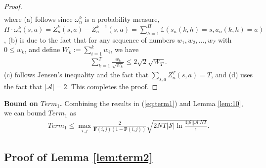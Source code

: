 \documentclass{article} %
\newcommand{\bF}{\mathbf{F}}
\newcommand{\cA}{\mathcal{A}}
\newcommand{\cS}{\mathcal{S}}
\begin{document}
{\begin{proof}
\begin{align}
\end{align}
where (a) follows since $\omega_n^k$ is a probability measure, $H\cdot\omega_n^k(s,a)=Z_n^{k}(s,a)-Z_n^{k-1}(s,a)=\sum_{h=1}^{H}\mathds{1}(s_n(k,h)=s,a_n(k,h)=a)$, (b) is due to the fact that 
for any sequence of numbers $w_1,w_2,...,w_T$ with $0\leq w_k$, and define $W_{k}:=\sum_{i=1}^k w_i$, we have
    \begin{align*}
        \sum_{k=1}^T \frac{w_k}{\sqrt{W_{k}}} \leq 2\sqrt{2} \sqrt{W_T}.
    \end{align*}
(c) follows Jensen's inequality and the fact that $\sum_{s,a}Z_n^T(s,a)=T$, and (d) uses the fact that $|\mathcal{A}|=2$. This completes the proof.
\end{proof}

\textbf{Bound on $Term_1$.} {Combining the results in (\ref{eq:term1}) and} Lemma \ref{lem:10}, we can bound $Term_1$ as
\begin{align*}
    Term_1\leq  \max_{i,j}\frac{2}{\bF(i,j)(1-\bF(i,j))}\sqrt{2NT|\cS|\ln\frac{4|\cS||\cA|NT}{\epsilon}}.
\end{align*}











\subsection{Proof of Lemma \ref{lem:term2}}\label{sec:D3}

}
\end{document}
